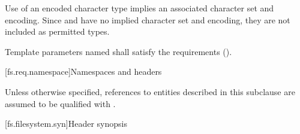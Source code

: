 \pnum
\begin{note} Use of an encoded character type implies an associated
character set and encoding.
Since  and  have no
implied character set and encoding,
they are not included as permitted types. \end{note}

\pnum
Template parameters named  shall satisfy the
 requirements ().

[fs.req.namespace]{Namespaces and headers}

\pnum
Unless otherwise specified, references to entities described in this
subclause are assumed to be qualified with .

[fs.filesystem.syn]{Header  synopsis}
%

